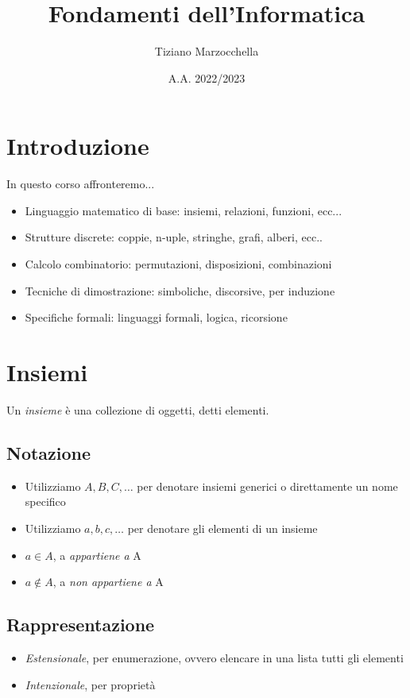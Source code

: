 \documentclass{article}
\title{Fondamenti dell'Informatica}
\author{Tiziano Marzocchella}
\date{A.A. 2022/2023}
\begin{document}


\section{Introduzione}
In questo corso affronteremo...
\begin{itemize}
    \item Linguaggio matematico di base: insiemi, relazioni, funzioni, ecc...
    \item Strutture discrete: coppie, n-uple, stringhe, grafi, alberi, ecc..
    \item Calcolo combinatorio: permutazioni, disposizioni, combinazioni
    \item Tecniche di dimostrazione: simboliche, discorsive, per induzione
    \item Specifiche formali: linguaggi formali, logica, ricorsione
\end{itemize}



\pagebreak

\section{Insiemi}
Un \emph{insieme} è una collezione di oggetti, detti elementi.

\subsection{Notazione}
\begin{itemize}
    \item Utilizziamo \(A, B, C, \dots\) per denotare insiemi generici o direttamente un nome specifico
    \item Utilizziamo \(a, b, c, \dots\) per denotare gli elementi di un insieme
    \item \(a \in A\), a \emph{appartiene a} A
    \item \(a \not\in A\), a \emph{non appartiene a} A
\end{itemize}

\subsection{Rappresentazione}
\begin{itemize}
    \item \emph{Estensionale}, per enumerazione, ovvero elencare in una lista tutti gli elementi
    \item \emph{Intenzionale}, per proprietà
\end{itemize}
\end{document}
